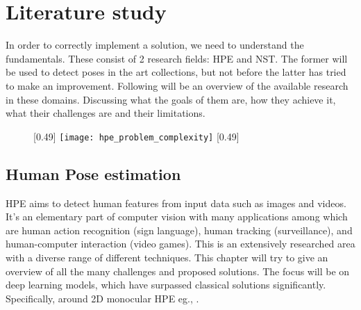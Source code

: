 \chapter{Literature study}
\label{chap:rel_work}
In order to correctly implement a solution, we need to understand the fundamentals.
These consist of 2 research fields: \gls{HPE} and \gls{NST}.
The former will be used to detect poses in the art collections, but not before the latter has tried to make an improvement.
Following will be an overview of the available research in these domains.
Discussing what the goals of them are, how they achieve it, what their challenges are and their limitations.

\begin{figure}
	\centering
	[0.49\textwidth]{
		\texttt{[image: hpe\_problem\_complexity]}
		\label{fig:hpe_problem_complexity}
	}
	[0.49\textwidth]{
		\label{fig:pose_representation}
	}
\end{figure}

\section{Human Pose estimation}
\label{sec:hpe}

\gls{HPE} aims to detect human features from input data such as images and videos.
It's an elementary part of computer vision with many applications among which are human action recognition (sign language), human tracking (surveillance), and human-computer interaction (video games).
This is an extensively researched area with a diverse range of different techniques.
This chapter will try to give an overview of all the many challenges and proposed solutions.
The focus will be on deep learning models, which have surpassed classical solutions significantly.
Specifically, around 2D monocular \gls{HPE} eg., \cite{Munea2020}\cite{Zheng2012}\cite{Liu2104}\cite{chen2022}.

